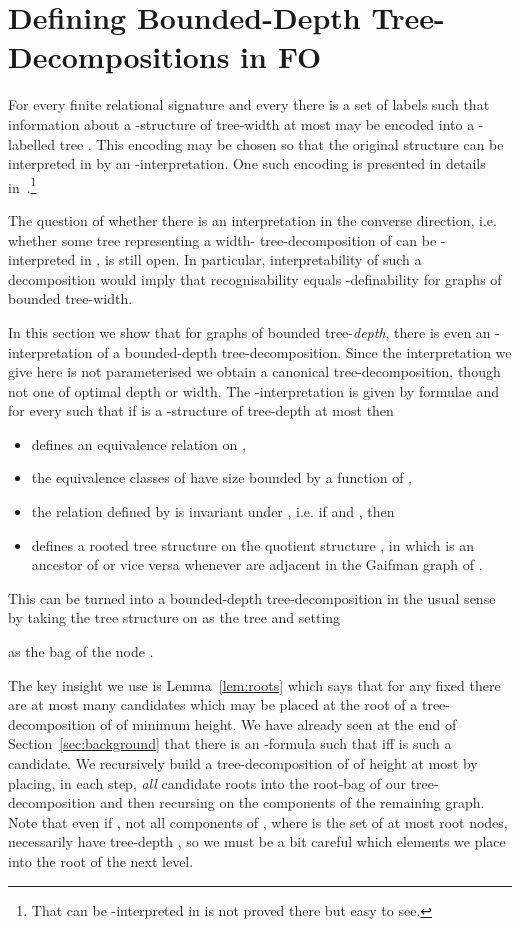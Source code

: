 \documentclass[11pt]{article}
\begin{document}
\section{Defining Bounded-Depth Tree-Decompositions in FO}
\label{sec:canondecomp}

For every finite relational signature  and every 
there is a set  of labels such that information
about a -structure  of tree-width at most  may be
encoded into a -labelled tree . This encoding
may be chosen so that the original structure  can be interpreted in
 by an -interpretation. One such encoding is presented in
details in~\cite[Section~11.4]{FlumGrohe2004}.\footnote{That  can
  be -interpreted in  is not proved there but easy to see.}

The question of whether there is an interpretation in the converse
direction, i.e. whether some tree  representing a width-
tree-decomposition of  can be -interpreted in , is still
open. In particular, interpretability of such a decomposition would
imply that recognisability equals -definability for graphs of
bounded tree-width.

In this section we show that for graphs of bounded tree-\emph{depth},
there is even an -interpretation of a bounded-depth
tree-decomposition. Since the interpretation we give here is not
parameterised we obtain a canonical tree-decomposition, though not one
of optimal depth or width. The -interpretation is given by
formulae  and  for every 
such that if  is a -structure of tree-depth at most 
then
\begin{itemize}
\item  defines an equivalence relation  on , 
\item the equivalence classes of  have size bounded by a
  function of ,
\item the relation defined by  is invariant under ,
  i.e. if  and , then
  
\item  defines a rooted tree structure on the quotient structure ,
  in which  is an ancestor of  or vice
  versa whenever  are adjacent in the Gaifman graph of
  .
\end{itemize}
This can be turned into a bounded-depth tree-decomposition in the
usual sense by taking the tree structure on  as the tree
and setting 

as the bag of the node .

The key insight we use is Lemma~\ref{lem:roots} which says that for any fixed
 there are at most  many candidates which may be placed at the root of
a tree-decomposition of  of minimum height. We have already seen at the end
of Section~\ref{sec:background} that there is an -formula
 such that  iff  is such a
candidate. We recursively build a tree-decomposition  of  of
height at most  by placing, in each step, \emph{all} candidate roots into the
root-bag of our tree-decomposition and then recursing on the components of the
remaining graph. Note that even if , not all components of ,
where  is the set of at most  root nodes, necessarily have tree-depth
, so we must be a bit careful which elements we place into the root of the
next level.
\end{document}

